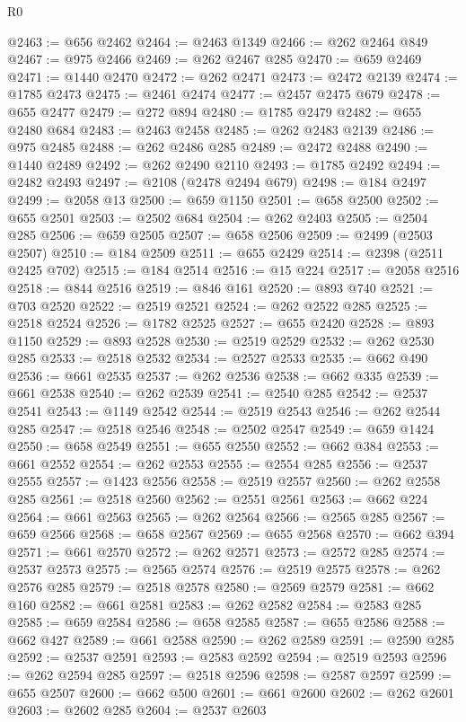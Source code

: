 \begin{lexlean}{R0}
\begin{coremodule}
@2463 := @656 @2462
@2464 := @2463 @1349
@2466 := @262 @2464 @849
@2467 := @975 @2466
@2469 := @262 @2467 @285
@2470 := @659 @2469
@2471 := @1440 @2470
@2472 := @262 @2471
@2473 := @2472 @2139
@2474 := @1785 @2473
@2475 := @2461 @2474
@2477 := @2457 @2475 @679
@2478 := @655 @2477
@2479 := @272 @894
@2480 := @1785 @2479
@2482 := @655 @2480 @684
@2483 := @2463 @2458
@2485 := @262 @2483 @2139
@2486 := @975 @2485
@2488 := @262 @2486 @285
@2489 := @2472 @2488
@2490 := @1440 @2489
@2492 := @262 @2490 @2110
@2493 := @1785 @2492
@2494 := @2482 @2493
@2497 := @2108 (@2478 @2494 @679)
@2498 := @184 @2497
@2499 := @2058 @13
@2500 := @659 @1150
@2501 := @658 @2500
@2502 := @655 @2501
@2503 := @2502 @684
@2504 := @262 @2403
@2505 := @2504 @285
@2506 := @659 @2505
@2507 := @658 @2506
@2509 := @2499 (@2503 @2507)
@2510 := @184 @2509
@2511 := @655 @2429
@2514 := @2398 (@2511 @2425 @702)
@2515 := @184 @2514
@2516 := @15 @224
@2517 := @2058 @2516
@2518 := @844 @2516
@2519 := @846 @161
@2520 := @893 @740
@2521 := @703 @2520
@2522 := @2519 @2521
@2524 := @262 @2522 @285
@2525 := @2518 @2524
@2526 := @1782 @2525
@2527 := @655 @2420
@2528 := @893 @1150
@2529 := @893 @2528
@2530 := @2519 @2529
@2532 := @262 @2530 @285
@2533 := @2518 @2532
@2534 := @2527 @2533
@2535 := @662 @490
@2536 := @661 @2535
@2537 := @262 @2536
@2538 := @662 @335
@2539 := @661 @2538
@2540 := @262 @2539
@2541 := @2540 @285
@2542 := @2537 @2541
@2543 := @1149 @2542
@2544 := @2519 @2543
@2546 := @262 @2544 @285
@2547 := @2518 @2546
@2548 := @2502 @2547
@2549 := @659 @1424
@2550 := @658 @2549
@2551 := @655 @2550
@2552 := @662 @384
@2553 := @661 @2552
@2554 := @262 @2553
@2555 := @2554 @285
@2556 := @2537 @2555
@2557 := @1423 @2556
@2558 := @2519 @2557
@2560 := @262 @2558 @285
@2561 := @2518 @2560
@2562 := @2551 @2561
@2563 := @662 @224
@2564 := @661 @2563
@2565 := @262 @2564
@2566 := @2565 @285
@2567 := @659 @2566
@2568 := @658 @2567
@2569 := @655 @2568
@2570 := @662 @394
@2571 := @661 @2570
@2572 := @262 @2571
@2573 := @2572 @285
@2574 := @2537 @2573
@2575 := @2565 @2574
@2576 := @2519 @2575
@2578 := @262 @2576 @285
@2579 := @2518 @2578
@2580 := @2569 @2579
@2581 := @662 @160
@2582 := @661 @2581
@2583 := @262 @2582
@2584 := @2583 @285
@2585 := @659 @2584
@2586 := @658 @2585
@2587 := @655 @2586
@2588 := @662 @427
@2589 := @661 @2588
@2590 := @262 @2589
@2591 := @2590 @285
@2592 := @2537 @2591
@2593 := @2583 @2592
@2594 := @2519 @2593
@2596 := @262 @2594 @285
@2597 := @2518 @2596
@2598 := @2587 @2597
@2599 := @655 @2507
@2600 := @662 @500
@2601 := @661 @2600
@2602 := @262 @2601
@2603 := @2602 @285
@2604 := @2537 @2603

\end{coremodule}
\end{lexlean}
